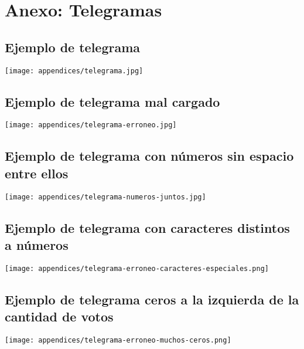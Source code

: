 \chapter{Anexo: Telegramas}

\section{Ejemplo de telegrama}
\label{anexo:telegrama}

\texttt{[image: appendices/telegrama.jpg]}

\section{Ejemplo de telegrama mal cargado}
\label{anexo:telegrama-erroneo}

\texttt{[image: appendices/telegrama-erroneo.jpg]}

\section{Ejemplo de telegrama con n\'umeros sin espacio entre ellos}
\label{anexo:telegrama-numeros-juntos}

\texttt{[image: appendices/telegrama-numeros-juntos.jpg]}

\section{Ejemplo de telegrama con caracteres distintos a n\'umeros}
\label{anexo:telegrama-erroneo-caracteres-especiales}

\texttt{[image: appendices/telegrama-erroneo-caracteres-especiales.png]}

\section{Ejemplo de telegrama ceros a la izquierda de la cantidad de votos}
\label{anexo:telegrama-erroneo-muchos-ceros}

\texttt{[image: appendices/telegrama-erroneo-muchos-ceros.png]}
